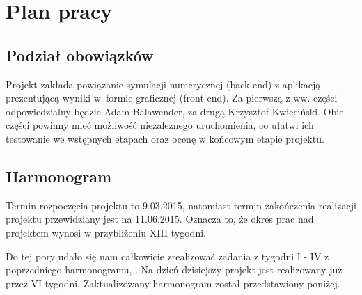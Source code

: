 
\section{Plan pracy}
\subsection{Podział obowiązków}
Projekt zakłada powiązanie symulacji numerycznej (back-end) z aplikacją prezentującą wyniki w~formie graficznej (front-end). Za pierwszą z ww. części odpowiedzialny będzie Adam
Balawender, za drugą Krzysztof Kwieciński. Obie części powinny mieć możliwość niezależnego uruchomienia, co ułatwi ich testowanie we wstępnych etapach oraz ocenę w końcowym etapie projektu.

\subsection{Harmonogram}
Termin rozpoczęcia projektu to 9.03.2015, natomiast termin zakończenia realizacji projektu przewidziany jest na 11.06.2015. Oznacza to, że okres prac nad projektem wynosi w przybliżeniu XIII tygodni.

Do tej pory udało się nam całkowicie zrealizować zadania z tygodni I - IV z poprzedniego harmonogramu, \cite{ABKKZalPro}. Na dzień dzisiejszy projekt jest realizowany już przez VI tygodni. Zaktualizowany harmonogram został przedstawiony poniżej.

